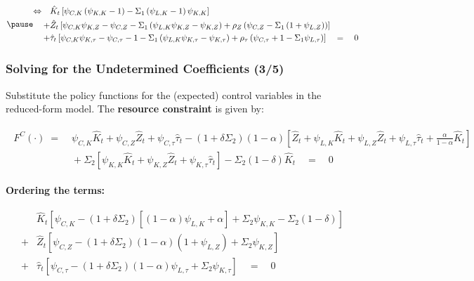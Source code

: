 \documentclass[10pt,c,aspectratio=1610,handout]{beamer}
\begin{document}
\begin{frame}
\begin{footnotesize}
\begin{align}
    \pause%
    \begin{split}%
      \Leftrightarrow \quad & \hat{K}_t \left[ \psi_{C,K} \left( \psi_{K,K} - 1 \right) - \Sigma_1 \left( \psi_{L,K} - 1 \right) \psi_{K,K} \right]\\%
      + & \hat{Z}_{t} \left[ \psi_{C,K} \psi_{K,Z} - \psi_{C,Z} - \Sigma_1 \left(\psi_{L,K} \psi_{K,Z} - \psi_{K,Z} \right) + \rho_Z \left(\psi_{C,Z} - \Sigma_1 \left(1+\psi_{L,Z}\right) \right) \right]\\%
      + & \hat{\tau}_{t} \left[ \psi_{C,K} \psi_{K,\tau} - \psi_{C,\tau} - 1 - \Sigma_1 \left( \psi_{L,K} \psi_{K,\tau} - \psi_{K,\tau} \right) + \rho_\tau \left( \psi_{C,\tau} + 1 - \Sigma_1 \psi_{L,\tau} \right) \right] \quad = \quad 0%
    \end{split}%
  \end{align}%
  \end{footnotesize}%
\end{frame}%
\begin{frame}%
  \frametitle{Solving for the Undetermined Coefficients (3/5)}%
  Substitute the policy functions for the (expected) control variables in the reduced-form model. The \textbf{resource constraint} is given by:%
  \begin{footnotesize}%
    \begin{align*}%
      \begin{split}%
        F^C(\cdot) \; = & \; \psi_{C,K} \hat{K}_t + \psi_{C,Z} \hat{Z}_{t} + \psi_{C,\tau} \hat{\tau}_{t} - \left(1+\delta \Sigma_2 \right) (1-\alpha) \left[ \hat{Z}_t + \psi_{L,K} \hat{K}_t + \psi_{L,Z} \hat{Z}_{t} + \psi_{L,\tau} \hat{\tau}_{t} + \frac{\alpha}{1-\alpha} \hat{K}_t \right]\\%
        & \; + \Sigma_2 \left[ \psi_{K,K} \hat{K}_t + \psi_{K,Z} \hat{Z}_{t} + \psi_{K,\tau} \hat{\tau}_{t} \right] - \Sigma_2 \left(1-\delta\right) \hat{K}_t \quad = \quad 0%
      \end{split}%
    \end{align*}%
  \end{footnotesize}%
  \pause%
  \textbf{Ordering the terms:}%
  \begin{footnotesize}%
  \begin{align}%
    \begin{split}%
      & \hat{K}_t \left[ \psi_{C,K} - \left(1+\delta \Sigma_2\right) \left[ (1-\alpha) \psi_{L,K} + \alpha \right] + \Sigma_2 \psi_{K,K} - \Sigma_2 \left(1-\delta\right) \right]\\%
      + & \hat{Z}_{t} \left[ \psi_{C,Z} - \left(1+\delta \Sigma_2\right)(1-\alpha)\left(1+\psi_{L,Z}\right) + \Sigma_2 \psi_{K,Z} \right]\\%
      + & \hat{\tau}_{t} \left[ \psi_{C,\tau} - \left(1+\delta \Sigma_2\right)(1-\alpha) \psi_{L,\tau} + \Sigma_2 \psi_{K,\tau} \right] \quad = \quad 0%
    \end{split}\label{eq:resource_policy}%
  \end{align}%
  \end{footnotesize}%
\end{frame}%
\end{document}
